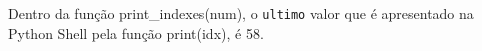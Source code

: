 \documentclass[12pt,varwidth=16cm,border=1pt]{standalone}
\begin{document}
Dentro da função print\_indexes(num), o \verb+ultimo+ valor que é apresentado na Python Shell pela função print(idx), é 58.

\questiomfalse
\end{document}
